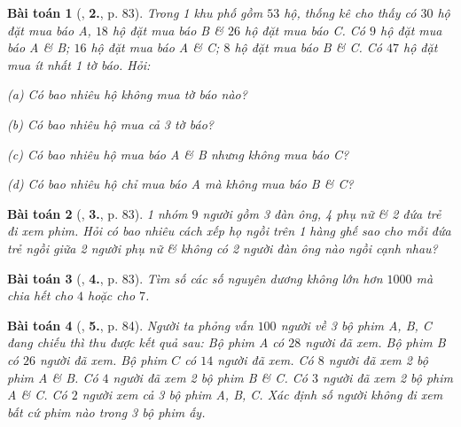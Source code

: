 \documentclass{article}
\numberwithin{equation}{section}
\newtheorem{baitoan}{Bài toán}[section]
\begin{document}
\begin{baitoan}[\cite{TL_chuyen_Toan_Dai_So_Giai_Tich_11}, \textbf{2.}, p. 83]
	Trong 1 khu phố gồm $53$ hộ, thống kê cho thấy có $30$ hộ đặt mua báo A, $18$ hộ đặt mua báo B \& $26$ hộ đặt mua báo C. Có $9$ hộ đặt mua báo A \& B; $16$ hộ đặt mua báo A \& C; $8$ hộ đặt mua báo B \& C. Có $47$ hộ đặt mua ít nhất 1 tờ báo. Hỏi:
	\begin{enumerate*}
		\item[(a)] Có bao nhiêu hộ không mua tờ báo nào?
		\item[(b)] Có bao nhiêu hộ mua cả 3 tờ báo?
		\item[(c)] Có bao nhiêu hộ mua báo A \& B nhưng không mua báo C?
		\item[(d)] Có bao nhiêu hộ chỉ mua báo A mà không mua báo B \& C?
	\end{enumerate*}
\end{baitoan}

\begin{baitoan}[\cite{TL_chuyen_Toan_Dai_So_Giai_Tich_11}, \textbf{3.}, p. 83]
	1 nhóm $9$ người gồm 3 đàn ông, 4 phụ nữ \& 2 đứa trẻ đi xem phim. Hỏi có bao nhiêu cách xếp họ ngồi trên 1 hàng ghế sao cho mỗi đứa trẻ ngồi giữa 2 người phụ nữ \& không có 2 người đàn ông nào ngồi cạnh nhau?
\end{baitoan}

\begin{baitoan}[\cite{TL_chuyen_Toan_Dai_So_Giai_Tich_11}, \textbf{4.}, p. 83]
	Tìm số các số nguyên dương không lớn hơn $1000$ mà chia hết cho $4$ hoặc cho $7$.
\end{baitoan}

\begin{baitoan}[\cite{TL_chuyen_Toan_Dai_So_Giai_Tich_11}, \textbf{5.}, p. 84]
	Người ta phỏng vấn $100$ người về 3 bộ phim A, B, C đang chiếu thì thu được kết quả sau: Bộ phim A có $28$ người đã xem. Bộ phim B có $26$ người đã xem. Bộ phim $C$ có $14$ người đã xem. Có $8$ người đã xem 2 bộ phim A \& B. Có $4$ người đã xem 2 bộ phim B \& C. Có $3$ người đã xem 2 bộ phim A \& C. Có $2$ người xem cả 3 bộ phim A, B, C. Xác định số người không đi xem bất cứ phim nào trong 3 bộ phim ấy.
\end{baitoan}
\end{document}
